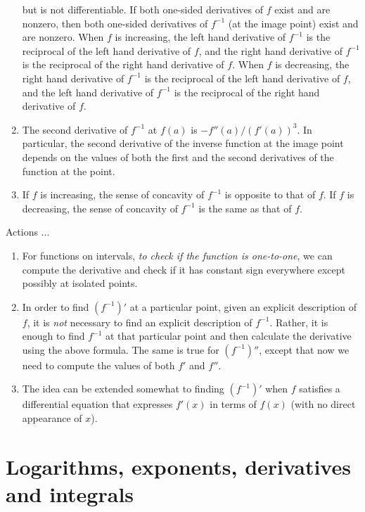 \documentclass[10pt]{amsart}
\begin{document}
\begin{enumerate}
  but is not differentiable. If both one-sided derivatives of $f$
  exist and are nonzero, then both one-sided derivatives of $f^{-1}$
  (at the image point) exist and are nonzero. When $f$ is increasing,
  the left hand derivative of $f^{-1}$ is the reciprocal of the left
  hand derivative of $f$, and the right hand derivative of $f^{-1}$ is
  the reciprocal of the right hand derivative of $f$. When $f$ is
  decreasing, the right hand derivative of $f^{-1}$ is the reciprocal
  of the left hand derivative of $f$, and the left hand derivative of
  $f^{-1}$ is the reciprocal of the right hand derivative of $f$.
\item The second derivative of $f^{-1}$ at $f(a)$ is
  $-f''(a)/(f'(a))^3$. In particular, the second derivative of the
  inverse function at the image point depends on the values of both
  the first and the second derivatives of the function at the point.
\item If $f$ is increasing, the sense of concavity of $f^{-1}$ is
  opposite to that of $f$. If $f$ is decreasing, the sense of
  concavity of $f^{-1}$ is the same as that of $f$.
\end{enumerate}

Actions ...

\begin{enumerate}
\item For functions on intervals, {\em to check if the function
  is one-to-one}, we can compute the derivative and check if it has
  constant sign everywhere except possibly at isolated points.
\item In order to find $(f^{-1})'$ at a particular point, given an
  explicit description of $f$, it is {\em not} necessary to find an
  explicit description of $f^{-1}$. Rather, it is enough to find
  $f^{-1}$ at that particular point and then calculate the derivative
  using the above formula. The same is true for $(f^{-1})''$, except
  that now we need to compute the values of both $f'$ and $f''$.
\item The idea can be extended somewhat to finding $(f^{-1})'$ when $f$
  satisfies a differential equation that expresses $f'(x)$ in terms of
  $f(x)$ (with no direct appearance of $x$).
\end{enumerate}

\section{Logarithms, exponents, derivatives and integrals}
\end{document}
